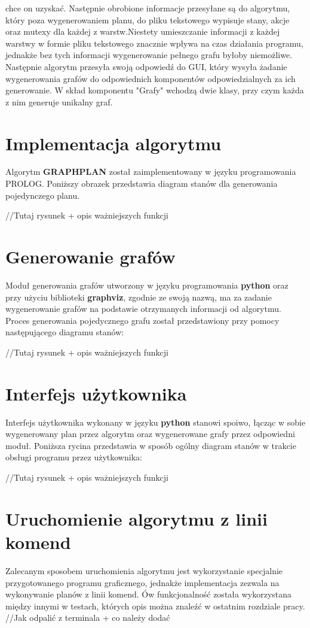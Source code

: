     chce on uzyskać. Następnie obrobione informacje przesyłane są do algorytmu, który poza wygenerowaniem planu, do pliku tekstowego wypisuje 
    stany, akcje oraz mutexy dla każdej z warstw.Niestety umieszczanie informacji z każdej warstwy w formie pliku tekstowego 
    znacznie wpływa na czas działania programu, jednakże bez tych informacji wygenerowanie pełnego grafu byłoby niemożliwe. 
    Następnie algorytm przesyła swoją odpowiedź do GUI, który wysyła żadanie wygenerowania grafów do odpowiednich komponentów odpowiedzialnych za ich 
    generowanie. W skład komponentu "Grafy" wchodzą dwie klasy, przy czym każda z nim generuje unikalny graf.

\section{Implementacja algorytmu}
    Algorytm \textbf{GRAPHPLAN} został zaimplementowany w języku programowania PROLOG. Poniższy obrazek przedstawia diagram stanów dla 
    generowania pojedynczego planu.

    //Tutaj rysunek + opis ważniejszych funkcji

\section{Generowanie grafów}
    Moduł generowania grafów utworzony w języku programowania \textbf{python} oraz przy użyciu biblioteki \textbf{graphviz}, zgodnie ze swoją nazwą,
    ma za zadanie wygenerowanie grafów na podstawie otrzymanych informacji od algorytmu. Proces generowania pojedycznego grafu został przedstawiony 
    przy pomocy następującego diagramu stanów:

    //Tutaj rysunek + opis ważniejszych funkcji

\section{Interfejs użytkownika}
    Interfejs użytkownika wykonany w języku \textbf{python} stanowi spoiwo, łącząc w sobie wygenerowany plan przez algorytm oraz wygenerowane grafy przez 
    odpowiedni moduł. Poniższa rycina przedstawia w sposób ogólny diagram stanów w trakcie obsługi programu przez użytkownika:

    //Tutaj rysunek + opis ważniejszych funkcji


\section{Uruchomienie algorytmu z linii komend}
    \label{CommandLine}
    Zalecanym sposobem uruchomienia algorytmu jest wykorzystanie specjalnie przygotowanego programu graficznego, jednakże implementacja zezwala na 
    wykonywanie planów z linii komend. Ów funkcjonalność została wykorzystana między innymi w testach, których opis można znaleźć w ostatnim rozdziale pracy.
    //Jak odpalić z terminala + co należy dodać
